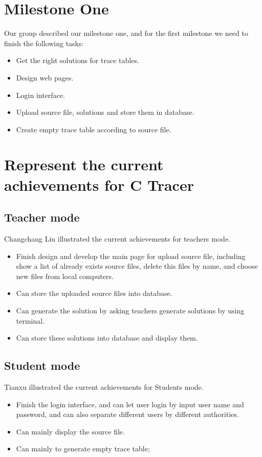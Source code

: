 \documentclass[11pt, a4paper]{article}
\begin{document}
\section{Milestone One}
Our group described our milestone one, and for the first milestone we need to finish the following tasks:
\begin{itemize}
\item Get the right solutions for trace tables.
\item Design web pages.
\item Login interface.
\item Upload source file, solutions and store them in database.
\item Create empty trace table according to source file.
\end{itemize}

\section{Represent the current achievements for C Tracer}
\subsection{Teacher mode}
Changchang Liu illustrated the current achievements for teachers mode.
\begin{itemize}
\item Finish design and develop the main page for upload source file, including show a list of already exists source files, delete this files by name, and choose new files from local computers.
\item Can store the uploaded source files into database.
\item Can generate the solution by asking teachers generate solutions by using terminal.
\item Can store these solutions into database and display them.
\end{itemize}
\subsection{Student mode}
Tianxu illustrated the current achievements for Students mode.
\begin{itemize}
\item Finish the login interface, and can let user login by input user name and password, and can also separate different users by different authorities.
\item Can mainly display the source file.
\item Can mainly to generate empty trace table;
\end{itemize}
\end{document}
